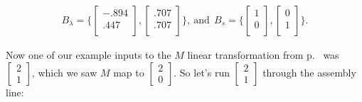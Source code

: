 \vspace{-.15in}
\begin{align*}
B_\lambda = \Bigg\{
\begin{bmatrix}
-.894 \\
.447 \\
\end{bmatrix}, 
\begin{bmatrix}
.707 \\
.707 \\
\end{bmatrix} \Bigg\}, \ \textrm{and}\ \ 
B_s = \Bigg\{
\begin{bmatrix}
1 \\
0 \\
\end{bmatrix}, 
\begin{bmatrix}
0 \\
1 \\
\end{bmatrix} \Bigg\}.
\end{align*}
\vspace{-.15in}

Now one of our example inputs to the $M$ linear transformation from
p.~\pageref{thatExample} was {\footnotesize $\begin{bmatrix} 2 \\ 1
\end{bmatrix}$}, which we saw $M$ map to {\footnotesize $\begin{bmatrix} 2 \\ 0
\end{bmatrix}$}. So let's run {\footnotesize $\begin{bmatrix} 2 \\ 1
\end{bmatrix}$} through the assembly line:

